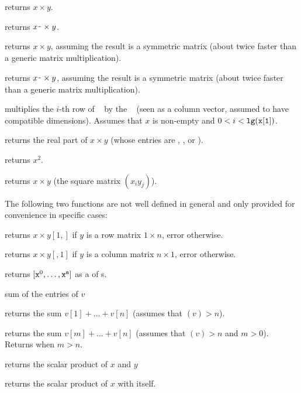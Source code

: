  returns $x\times y$.

 returns $x\til \times y$.

 returns $x\times y$, assuming
the result is a symmetric matrix (about twice faster than a generic matrix
multiplication).

 returns $x\til \times y$, assuming
the result is a symmetric matrix (about twice faster than a generic matrix
multiplication).

 multiplies the $i$-th row of
~ by the ~ (seen as a column vector, assumed
to have compatible dimensions). Assumes that $x$ is non-empty and $0 < i <
{\tt lg(x[1])}$.

 returns the real part of $x\times y$
(whose entries are , ,  or ).

 returns $x^2$.

 returns $x\times y$ (the square matrix
$(x_iy_j)$).

The following two functions are not well defined in general and only provided
for convenience in specific cases:

 returns $x\times y[1,]$ if $y$ is
a row matrix $1\times n$, error otherwise.

 returns $x\times y[,1]$ if $y$ is
a column matrix $n\times 1$, error otherwise.

 returns $[{\tt x}^0,
\dots, {\tt x}^{\tt n}]$ as a  of s.

\smallskip
{} sum of the entries of $v$

 returns the sum $v[1] + \dots + v[n]$
(assumes that $(v) > n$).

 returns the sum $v[m] + \dots +
v[n]$ (assumes that $(v) > n$ and $m > 0$). Returns 
when $m > n$.

 returns the scalar product of $x$ and $y$

 returns the scalar product of $x$ with itself.

